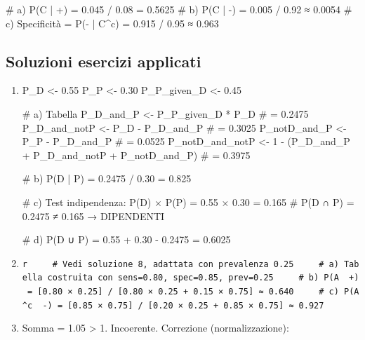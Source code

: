 \documentclass[
  letterpaper,
  DIV=11,
  numbers=noendperiod,
  oneside]{scrreprt}
\newenvironment{Shaded}{\begin{snugshade}}{\end{snugshade}}
\newcommand{\CommentTok}[1]{\textcolor[rgb]{0.37,0.37,0.37}{#1}}
\newcommand{\DecValTok}[1]{\textcolor[rgb]{0.68,0.00,0.00}{#1}}
\newcommand{\FloatTok}[1]{\textcolor[rgb]{0.68,0.00,0.00}{#1}}
\newcommand{\NormalTok}[1]{\textcolor[rgb]{0.00,0.23,0.31}{#1}}
\newcommand{\OtherTok}[1]{\textcolor[rgb]{0.00,0.23,0.31}{#1}}
\newcommand{\SpecialCharTok}[1]{\textcolor[rgb]{0.37,0.37,0.37}{#1}}
\theoremstyle{definition}
\theoremstyle{plain}
\theoremstyle{definition}
\theoremstyle{remark}
\begin{document}
\begin{tcolorbox}
\begin{enumerate}
\begin{Shaded}
\begin{Highlighting}[]
\CommentTok{\# a) P(C | +) = 0.045 / 0.08 = 0.5625}
\CommentTok{\# b) P(C | {-}) = 0.005 / 0.92 ≈ 0.0054}
\CommentTok{\# c) Specificità = P({-} | C\^{}c) = 0.915 / 0.95 ≈ 0.963}
\end{Highlighting}
\end{Shaded}
\end{enumerate}

\subsection{Soluzioni esercizi
applicati}\label{soluzioni-esercizi-applicati}

\begin{enumerate}
\def\labelenumi{\arabic{enumi}.}
\setcounter{enumi}{9}
\item
\begin{Shaded}
\begin{Highlighting}[]
\NormalTok{P\_D }\OtherTok{\textless{}{-}} \FloatTok{0.55}
\NormalTok{P\_P }\OtherTok{\textless{}{-}} \FloatTok{0.30}
\NormalTok{P\_P\_given\_D }\OtherTok{\textless{}{-}} \FloatTok{0.45}

\CommentTok{\# a) Tabella}
\NormalTok{P\_D\_and\_P }\OtherTok{\textless{}{-}}\NormalTok{ P\_P\_given\_D }\SpecialCharTok{*}\NormalTok{ P\_D  }\CommentTok{\# = 0.2475}
\NormalTok{P\_D\_and\_notP }\OtherTok{\textless{}{-}}\NormalTok{ P\_D }\SpecialCharTok{{-}}\NormalTok{ P\_D\_and\_P  }\CommentTok{\# = 0.3025}
\NormalTok{P\_notD\_and\_P }\OtherTok{\textless{}{-}}\NormalTok{ P\_P }\SpecialCharTok{{-}}\NormalTok{ P\_D\_and\_P  }\CommentTok{\# = 0.0525}
\NormalTok{P\_notD\_and\_notP }\OtherTok{\textless{}{-}} \DecValTok{1} \SpecialCharTok{{-}}\NormalTok{ (P\_D\_and\_P }\SpecialCharTok{+}\NormalTok{ P\_D\_and\_notP }\SpecialCharTok{+}\NormalTok{ P\_notD\_and\_P)  }\CommentTok{\# = 0.3975}

\CommentTok{\# b) P(D | P) = 0.2475 / 0.30 = 0.825}

\CommentTok{\# c) Test indipendenza: P(D) × P(P) = 0.55 × 0.30 = 0.165}
\CommentTok{\#    P(D ∩ P) = 0.2475 ≠ 0.165 → DIPENDENTI}

\CommentTok{\# d) P(D ∪ P) = 0.55 + 0.30 {-} 0.2475 = 0.6025}
\end{Highlighting}
\end{Shaded}
\item
  \texttt{r\ \ \ \ \ \#\ Vedi\ soluzione\ 8,\ adattata\ con\ prevalenza\ 0.25\ \ \ \ \ \#\ a)\ Tabella\ costruita\ con\ sens=0.80,\ spec=0.85,\ prev=0.25\ \ \ \ \ \#\ b)\ P(A\ \textbar{}\ +)\ =\ {[}0.80\ ×\ 0.25{]}\ /\ {[}0.80\ ×\ 0.25\ +\ 0.15\ ×\ 0.75{]}\ ≈\ 0.640\ \ \ \ \ \#\ c)\ P(A\^{}c\ \textbar{}\ -)\ =\ {[}0.85\ ×\ 0.75{]}\ /\ {[}0.20\ ×\ 0.25\ +\ 0.85\ ×\ 0.75{]}\ ≈\ 0.927}
\item
  Somma = 1.05 \textgreater{} 1. Incoerente. Correzione
  (normalizzazione):


\end{enumerate}
\end{tcolorbox}
\end{document}
